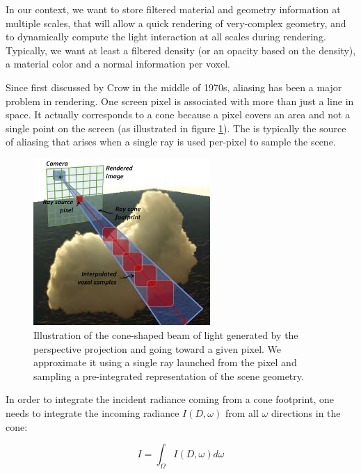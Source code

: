 In our context, we want to store filtered material and geometry information at multiple scales, that will allow a quick rendering of very-complex geometry, and to dynamically compute the light interaction at all scales during rendering. Typically, we want at least a filtered density (or an opacity based on the density), a material color and a normal information per voxel.

Since first discussed by Crow\cite{a:Thealiasingproblemincomputer-generatedshadedimages} in the middle of 1970s, aliasing has been a major problem in rendering. One screen pixel is associated with more than just a line in space. It actually corresponds to a cone because a pixel covers an area and not a single point on the screen (as illustrated in figure \ref{f:vct-aliasing}). The is typically the source of aliasing that arises when a single ray is used per-pixel to sample the scene.

\begin{figure}\label{f:vct-aliasing}
	\begin{center}
		\includegraphics[width=0.6\textwidth]{graphics/vct/vct-6-1}
	\end{center}
	\caption{Illustration of the cone-shaped beam of light generated by the perspective projection and going toward a given pixel. We approximate it using a single ray launched from the pixel and sampling a pre-integrated representation of the scene geometry.}
\end{figure}

In order to integrate the incident radiance coming from a cone footprint, one needs to integrate the incoming radiance $I(D,\omega)$ from all $\omega$ directions in the cone:

\begin{equation*}
	I=\int_\Omega I(D,\omega)d\omega
\end{equation*}


